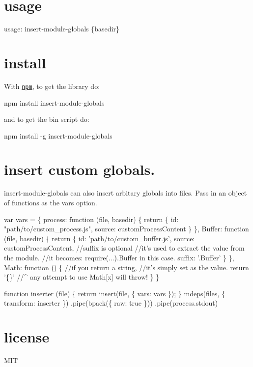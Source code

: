\section*{usage}


\begin{DoxyCode}
usage: insert-module-globals \{basedir\}
\end{DoxyCode}


\section*{install}

With \href{https://npmjs.org}{\tt npm}, to get the library do\+:


\begin{DoxyCode}
npm install insert-module-globals
\end{DoxyCode}


and to get the bin script do\+:


\begin{DoxyCode}
npm install -g insert-module-globals
\end{DoxyCode}


\section*{insert custom globals.}

{\ttfamily insert-\/module-\/globals} can also insert arbitary globals into files. Pass in an object of functions as the {\ttfamily vars} option.


\begin{DoxyCode}
var vars = \{
    process: function (file, basedir) \{
        return \{
            id: "path/to/custom\_process.js",
            source: customProcessContent
        \}
    \},
    Buffer: function (file, basedir) \{
        return \{
            id: 'path/to/custom\_buffer.js',
            source: customProcessContent,
            //suffix is optional
            //it's used to extract the value from the module.
            //it becomes: require(...).Buffer in this case.
            suffix: '.Buffer'
        \}
    \},
    Math: function () \{
        //if you return a string,
        //it's simply set as the value.
        return '\{\}'
        //^ any attempt to use Math[x] will throw!
    \}
\}

function inserter (file) \{
    return insert(file, \{ vars: vars \});
\}
mdeps(files, \{ transform: inserter \})
    .pipe(bpack(\{ raw: true \}))
    .pipe(process.stdout)
\end{DoxyCode}


\section*{license}

M\+IT 
